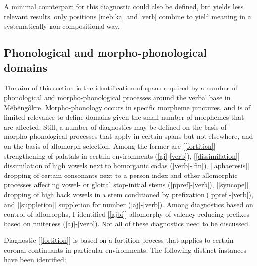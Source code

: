 \documentclass[output=paper]{langscibook}
\begin{document}
A minimal counterpart for this diagnostic could also be defined, but yields less relevant results: only positions \ref{meb:ka} and \ref{verb} combine to yield meaning in a systematically non-compositional way.

\subsection{Phonological and morpho-phonological domains}

The aim of this section is the identification of spans required by a number of phonological and morpho-phonological processes around the verbal base in Mẽ\-bêngôkre. Morpho-phonology occurs in specific morpheme junctures, and is of limited relevance to define domains given the small number of morphemes that are affected. Still, a number of diagnostics may be defined on the basis of morpho-phonological processes that apply in certain spans but not elsewhere, and on the basis of allomorph selection. Among the former are [\ref{fortition}] strengthening of palatals in certain environments (\ref{aj}-\ref{verb}), [\ref{dissimilation}] dissimilation of high vowels next to homorganic codas (\ref{verb}-\ref{fin}), [\ref{aphaeresis}] dropping of certain consonants next to a person index and other allomorphic processes affecting vowel- or glottal stop-initial stems (\ref{ppref}-\ref{verb}), [\ref{syncope}] dropping of high back vowels in a stem conditioned by prefixation (\ref{ppref}-\ref{verb}), and [\ref{suppletion}] suppletion for number (\ref{aj}-\ref{verb}). Among diagnostics based on control of allomorphs, I identified [\ref{ajbi}] allomorphy of valency-reducing prefixes based on finiteness (\ref{aj}-\ref{verb}). Not all of these diagnostics need to be discussed.

Diagnostic [\ref{fortition}] is based on a fortition process that applies to certain coronal continuants in particular environments. The following distinct instances have been identified:
\end{document}
